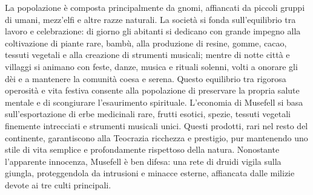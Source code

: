 \documentclass[10pt, a4paper]{report}
\begin{document}
\begin{multicols}{2}
La popolazione è composta principalmente da gnomi, affiancati da piccoli gruppi di umani, mezz'elfi e altre razze naturali. La società si fonda sull’equilibrio tra lavoro e celebrazione: di giorno gli abitanti si dedicano con grande impegno alla coltivazione di piante rare, bambù, alla produzione di resine, gomme, cacao, tessuti vegetali e alla creazione di strumenti musicali; mentre di notte città e villaggi si animano con feste, danze, musica e rituali solenni, volti a onorare gli dèi e a mantenere la comunità coesa e serena. Questo equilibrio tra rigorosa operosità e vita festiva consente alla popolazione di preservare la propria salute mentale e di scongiurare l’esaurimento spirituale.
L’economia di Musefell si basa sull'esportazione di erbe medicinali rare, frutti esotici, spezie, tessuti vegetali finemente intrecciati e strumenti musicali unici. Questi prodotti, rari nel resto del continente, garantiscono alla Teocrazia ricchezza e prestigio, pur mantenendo uno stile di vita semplice e profondamente rispettoso della natura.
Nonostante l’apparente innocenza, Musefell è ben difesa: una rete di druidi vigila sulla giungla, proteggendola da intrusioni e minacce esterne, affiancata dalle milizie devote ai tre culti principali.


\end{multicols}
\end{document}
